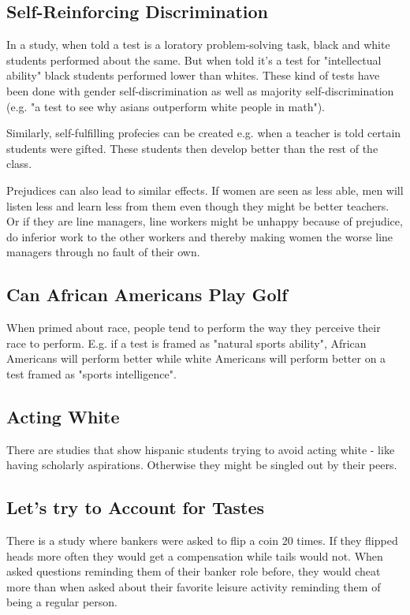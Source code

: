 \documentclass[a4paper, twocolumn]{article}
\begin{document}
\subsection{Self-Reinforcing Discrimination}
In a study, when told a test is a loratory problem-solving task, black and white students performed about the same. But when told it's a test for "intellectual ability" black students performed lower than whites. \cite{stereotype-performance} These kind of tests have been done with gender self-discrimination as well as majority self-discrimination (e.g. "a test to see why asians outperform white people in math").

Similarly, self-fulfilling profecies can be created e.g. when a teacher is told certain students were gifted. These students then develop better than the rest of the class.

Prejudices can also lead to similar effects. If women are seen as less able, men will listen less and learn less from them even though they might be better teachers. Or if they are line managers, line workers might be unhappy because of prejudice, do inferior work to the other workers and thereby making women the worse line managers through no fault of their own. \cite{women-line-managers}

\subsection{Can African Americans Play Golf}
When primed about race, people tend to perform the way they perceive their race to perform. E.g. if a test is framed as "natural sports ability", African Americans will perform better while white Americans will perform better on a test framed as "sports intelligence".

\subsection{Acting White}
There are studies that show hispanic students trying to avoid acting white - like having scholarly aspirations. Otherwise they might be singled out by their peers.

\subsection{Let's try to Account for Tastes}
There is a study where bankers were asked to flip a coin 20 times. If they flipped heads more often they would get a compensation while tails would not. When asked questions reminding them of their banker role before, they would cheat more than when asked about their favorite leisure activity reminding them of being a regular person. \cite{banker-dishonesty} 
\end{document}

